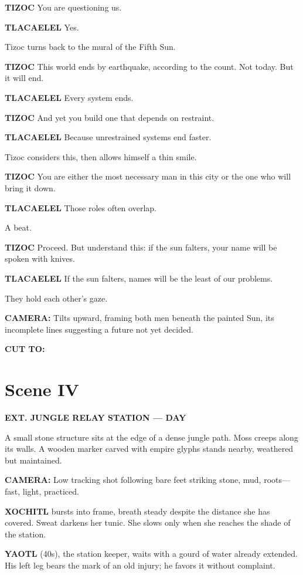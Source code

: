 \documentclass[12pt]{article}
\begin{document}
\textbf{TIZOC}  
You are questioning us.

\textbf{TLACAELEL}  
Yes.

Tizoc turns back to the mural of the Fifth Sun.

\textbf{TIZOC}  
This world ends by earthquake, according to the count.  
Not today.  
But it will end.

\textbf{TLACAELEL}  
Every system ends.

\textbf{TIZOC}  
And yet you build one that depends on restraint.

\textbf{TLACAELEL}  
Because unrestrained systems end faster.

Tizoc considers this, then allows himself a thin smile.

\textbf{TIZOC}  
You are either the most necessary man in this city  
or the one who will bring it down.

\textbf{TLACAELEL}  
Those roles often overlap.

A beat.

\textbf{TIZOC}  
Proceed.  
But understand this: if the sun falters,  
your name will be spoken with knives.

\textbf{TLACAELEL}  
If the sun falters,  
names will be the least of our problems.

They hold each other’s gaze.

\textbf{CAMERA:} Tilts upward, framing both men beneath the painted Sun, its incomplete lines suggesting a future not yet decided.

\textbf{CUT TO:}

\section*{Scene IV}

\textbf{EXT. JUNGLE RELAY STATION — DAY}

A small stone structure sits at the edge of a dense jungle path. Moss creeps along its walls. A wooden marker carved with empire glyphs stands nearby, weathered but maintained.

\textbf{CAMERA:} Low tracking shot following bare feet striking stone, mud, roots—fast, light, practiced.

\textbf{XOCHITL} bursts into frame, breath steady despite the distance she has covered. Sweat darkens her tunic. She slows only when she reaches the shade of the station.

\textbf{YAOTL} (40s), the station keeper, waits with a gourd of water already extended. His left leg bears the mark of an old injury; he favors it without complaint.
\end{document}
